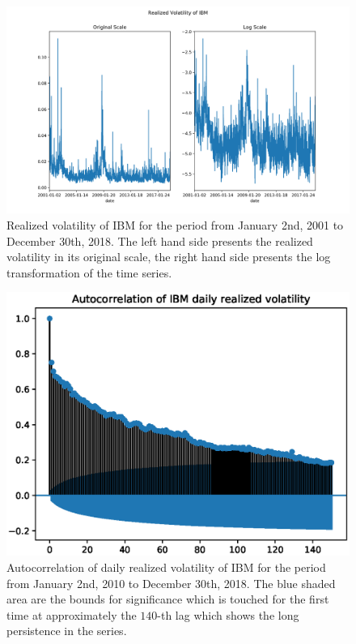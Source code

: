 \begin{figure}
    \begin{center}
        \includegraphics[width=\textwidth]{Plots/IBM_RVAR.png}
    \end{center}
    \caption{Realized volatility of IBM for the period from January 2nd, 2001 to December 30th, 2018. The left hand side presents the realized volatility in its original scale, the right hand side presents the log transformation of the time series.}
    \label{FIG:IBMRVAR:Series}
\end{figure}

\begin{figure}
    \begin{center}
        \includegraphics[width=\textwidth]{Plots/IBM_RVAR_autocorr.eps}
    \end{center}
    \caption{Autocorrelation of daily realized volatility of IBM for the period from January 2nd, 2010 to December 30th, 2018. The blue shaded area are the bounds for significance which is touched for the first time at approximately the $140$-th lag which shows the long persistence in the series.}
    \label{FIG:IBMRVAR:Autocorr}
\end{figure}

